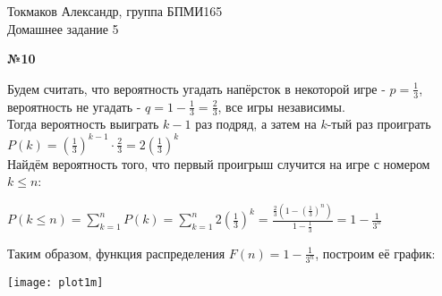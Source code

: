 \documentclass{article}
\newenvironment{task}{\begin{center}\fontsize{14}{14}\selectfont\bf}{\rm\fontsize{12}{12}\selectfont\end{center}}
\begin{document}
	\begin{center}
		Токмаков Александр, группа БПМИ165 \\
		Домашнее задание 5
	\end{center}
	
	\begin{task} 
		№10
	\end{task}
	Будем считать, что вероятность угадать напёрсток в некоторой игре - $p = \frac{1}{3}$, вероятность не угадать - $q = 1 - \frac{1}{3} = \frac{2}{3}$, все игры независимы. \\ Тогда вероятность выиграть $k-1$ раз подряд, а затем на $k$-тый раз проиграть $P(k) = \left(\frac{1}{3}\right)^{k-1}\cdot \frac{2}{3} = 2\left(\frac{1}{3}\right)^k$ \\
	Найдём вероятность того, что первый проигрыш случится на игре с номером $k \leq n$:
	\begin{center}
		$P(k \leq n) = \sum\limits_{k=1}^{n}P(k) = \sum\limits_{k=1}^{n}2\left(\frac{1}{3}\right)^k
		= \frac{\frac{2}{3}\left(1 - \left(\frac{1}{3}\right)^n\right)}{1 - \frac{1}{3}} 
		= 1 - \frac{1}{3^n}$
	\end{center}
	Таким образом, функция распределения $F(n) = 1 - \frac{1}{3^n}$, построим её график:\\
	\begin{center}
		\texttt{[image: plot1m]}
	\end{center}
	



	
	
\end{document}
